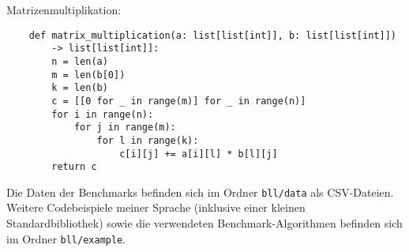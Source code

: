     \noindent Matrizenmultiplikation:
    \begin{lstlisting}
    def matrix_multiplication(a: list[list[int]], b: list[list[int]]) 
        -> list[list[int]]:
        n = len(a)
        m = len(b[0])
        k = len(b)
        c = [[0 for _ in range(m)] for _ in range(n)]
        for i in range(n):
            for j in range(m):
                for l in range(k):
                    c[i][j] += a[i][l] * b[l][j]
        return c
    \end{lstlisting}

    \vspace{1cm}

    \noindent Die Daten der Benchmarks befinden sich im Ordner \texttt{bll/data} als CSV-Dateien.
    Weitere Codebeispiele meiner Sprache (inklusive einer kleinen Standardbibliothek) sowie die 
    verwendeten Benchmark-Algorithmen befinden sich im Ordner \texttt{bll/example}.
